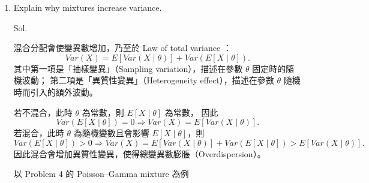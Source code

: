 \documentclass[a4paper, 12pt]{article}  %
\begin{document}
\begin{enumerate}
        Let $$X\mid P=p \sim \mathrm{Bin}(n,p),　P\sim \mathrm{Beta}(\alpha,\beta),　\alpha,\beta>0,$$
        where$$f_P(p)=\frac{1}{B(\alpha, \beta)}p^{\alpha-1}(1-p)^{\beta-1},　0<p<1,$$
        and $$B(\alpha,\beta)=\frac{\Gamma(\alpha)\Gamma(\beta)}{\Gamma(\alpha+\beta)}.$$
        Also,$$P_{X\mid P}(x\mid p)=\binom{n}{x}p^x(1-p)^{n-x},　x=0,1,\dots,n.$$
        Then we compute
        \begin{align*}
        P(X=x)
        &=\int_0^1 P_{X\mid P}(x\mid p)f_P(p)dp \\
        &=\int_0^1 \binom{n}{x}p^x(1-p)^{n-x}\cdot \frac{1}{B(\alpha,\beta)}p^{\alpha-1}(1-p)^{\beta-1}dp \\
        &=\binom{n}{x}\frac{1}{B(\alpha,\beta)}\int_0^1 p^{x+\alpha-1}(1-p)^{n-x+\beta-1}dp \\
        &=\binom{n}{x}\frac{B(x+\alpha,\ n-x+\beta)}{B(\alpha,\beta)} \\
        &=\binom{n}{x}\frac{\Gamma(x+\alpha)\Gamma(n-x+\beta)}{\Gamma(n+\alpha+\beta)}\cdot \frac{\Gamma(\alpha+\beta)}{\Gamma(\alpha)\Gamma(\beta)},　x=0,1,\dots,n.
        \end{align*}
        It is the Beta--Binomial pmf.

        \item Explain why mixtures increase variance.
        
        Sol.

        混合分配會使變異數增加，乃至於 Law of total variance ：
        $$Var(X)=E\left[Var(X\mid \theta)\right]+Var\left(E[X\mid \theta]\right).$$
        其中第一項是「抽樣變異」（Sampling variation），描述在參數 $\theta$ 固定時的隨機波動；
        第二項是「異質性變異」（Heterogeneity effect），描述在參數 $\theta$ 隨機時而引入的額外波動。

        若不混合，此時 $\theta$ 為常數，則 $E[X\mid \theta]$ 為常數，
        因此
        $$Var\left(E[X\mid \theta]\right)=0\Rightarrow Var(X)=E\left[Var(X\mid \theta)\right].$$
        若混合，此時 $\theta$ 為隨機變數且會影響 $E[X\mid\theta]$，則
        $$Var\left(E[X\mid \theta]\right)>0\Rightarrow Var(X)=E\left[Var(X\mid \theta)\right]+Var\left(E[X\mid \theta]\right)>E\!\left[Var(X\mid \theta)\right].$$
        因此混合會增加異質性變異，使得總變異數膨脹（Overdispersion）。

        以 Problem 4 的 Poisson–Gamma mixture 為例


\end{enumerate}
\end{document}
